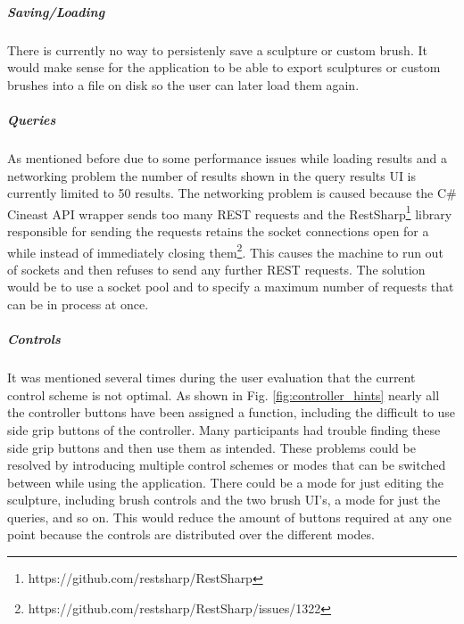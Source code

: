 \subparagraph{Saving/Loading}
There is currently no way to persistenly save a sculpture or custom brush. It would make sense for the application to be able to export sculptures or custom brushes into a file on disk so the user can later load them again.

\subparagraph{Queries}
As mentioned before due to some performance issues while loading results and a networking problem the number of results shown in the query results UI is currently limited to 50 results. The networking problem is caused because the C\# Cineast API wrapper sends too many REST requests and the RestSharp\footnote{https://github.com/restsharp/RestSharp} library responsible for sending the requests retains the socket connections open for a while instead of immediately closing them\footnote{https://github.com/restsharp/RestSharp/issues/1322}. This causes the machine to run out of sockets and then refuses to send any further REST requests. The solution would be to use a socket pool and to specify a maximum number of requests that can be in process at once.

\subparagraph{Controls}
It was mentioned several times during the user evaluation that the current control scheme is not optimal. As shown in Fig. \ref{fig:controller_hints} nearly all the controller buttons have been assigned a function, including the difficult to use side grip buttons of the controller. Many participants had trouble finding these side grip buttons and then use them as intended. These problems could be resolved by introducing multiple control schemes or modes that can be switched between while using the application. There could be a mode for just editing the sculpture, including brush controls and the two brush UI's, a mode for just the queries, and so on. This would reduce the amount of buttons required at any one point because the controls are distributed over the different modes.
